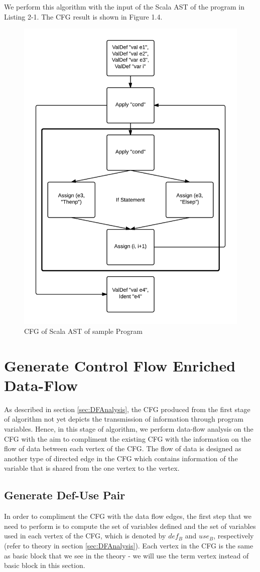 We perform this algorithm with the input of the Scala AST of the program in Listing 2-1. The CFG result is shown in Figure 1.4. 

\begin{figure}[h!]
\centering
\includegraphics[width=0.7\linewidth]{figures/FinalGraph}
\caption{CFG of Scala AST of sample Program}
\label{fig:FinalGraph}
\end{figure}

\section{Generate Control Flow Enriched Data-Flow}
As described in section \ref{sec:DFAnalysis}, the CFG produced from the first stage of algorithm not yet depicts the transmission of information through program variables. Hence, in this stage of algorithm, we perform data-flow analysis on the CFG with the aim to compliment the existing CFG with the information on the flow of data between each vertex of the CFG. The flow of data is designed as another type of directed edge in the CFG which contains information of the variable that is shared from the one vertex to the vertex. 

\subsection{Generate Def-Use Pair}
In order to compliment the CFG with the data flow edges, the first step that we need to perform is to compute the set of variables defined and the set of variables used in each vertex of the CFG, which is denoted by $def_{B}$ and $use_{B}$, respectively (refer to theory in section \ref{sec:DFAnalysis}). Each vertex in the CFG is the same as basic block that we see in the theory - we will use the term vertex instead of basic block in this section. 

